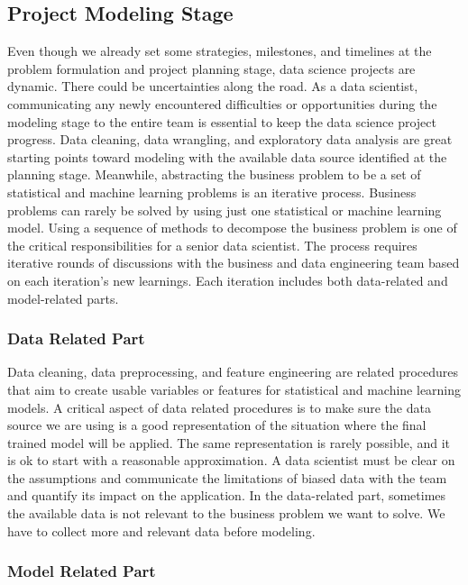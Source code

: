 \documentclass[12pt,]{krantz}
\begin{document}
\hypertarget{project-modeling-stage}{%
\subsection{Project Modeling Stage}\label{project-modeling-stage}}

Even though we already set some strategies, milestones, and timelines at the problem formulation and project planning stage, data science projects are dynamic. There could be uncertainties along the road. As a data scientist, communicating any newly encountered difficulties or opportunities during the modeling stage to the entire team is essential to keep the data science project progress. Data cleaning, data wrangling, and exploratory data analysis are great starting points toward modeling with the available data source identified at the planning stage. Meanwhile, abstracting the business problem to be a set of statistical and machine learning problems is an iterative process. Business problems can rarely be solved by using just one statistical or machine learning model. Using a sequence of methods to decompose the business problem is one of the critical responsibilities for a senior data scientist. The process requires iterative rounds of discussions with the business and data engineering team based on each iteration's new learnings. Each iteration includes both data-related and model-related parts.

\hypertarget{data-related-part}{%
\subsubsection{Data Related Part}\label{data-related-part}}

Data cleaning, data preprocessing, and feature engineering are related procedures that aim to create usable variables or features for statistical and machine learning models. A critical aspect of data related procedures is to make sure the data source we are using is a good representation of the situation where the final trained model will be applied. The same representation is rarely possible, and it is ok to start with a reasonable approximation. A data scientist must be clear on the assumptions and communicate the limitations of biased data with the team and quantify its impact on the application. In the data-related part, sometimes the available data is not relevant to the business problem we want to solve. We have to collect more and relevant data before modeling.

\hypertarget{model-related-part}{%
\subsubsection{Model Related Part}\label{model-related-part}}
\end{document}

